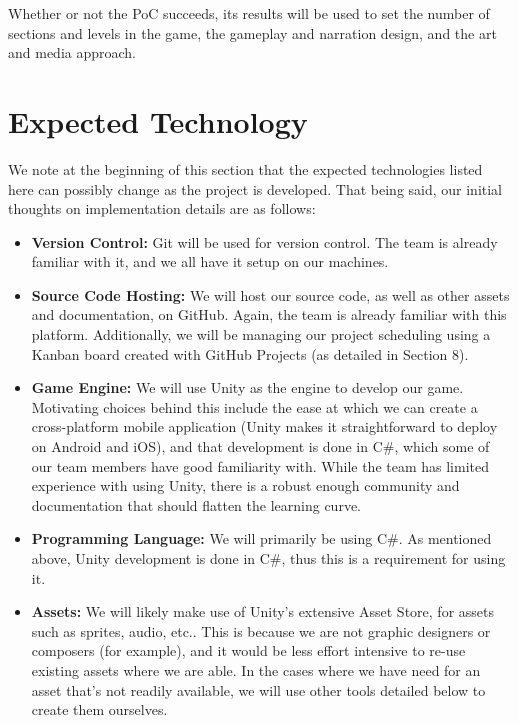 \documentclass{article}
\begin{document}
\noindent Whether or not the PoC succeeds, its results will be used to set the
number of sections and levels in the game, the gameplay and narration design,
and the art and media approach.

\section{Expected Technology}

We note at the beginning of this section that the expected technologies listed here can possibly change as the project is
developed. That being said, our initial thoughts on implementation details are as follows:

\begin{itemize}
    \item \textbf{Version Control:} Git will be used for version control. The team is already familiar with it, and we all
    have it setup on our machines.

    \item \textbf{Source Code Hosting:} We will host our source code, as well as other assets and documentation, on GitHub.
    Again, the team is already familiar with this platform. Additionally, we will be managing our project scheduling using a
    Kanban board created with GitHub Projects (as detailed in Section 8).

    \item \textbf{Game Engine:} We will use Unity as the engine to develop our game. Motivating choices behind this include
    the ease at which we can create a cross-platform mobile application (Unity makes it straightforward to deploy on Android
    and iOS), and that development is done in C\#, which some of our team members have good familiarity with. While the team
    has limited experience with using Unity, there is a robust enough community and documentation that should flatten the
    learning curve.

    \item \textbf{Programming Language:} We will primarily be using C\#. As mentioned above, Unity development is done in
    C\#, thus this is a requirement for using it.

    \item \textbf{Assets:} We will likely make use of Unity's extensive Asset Store, for assets such as sprites, audio, etc..
    This is because we are not graphic designers or composers (for example), and it would be less effort intensive to re-use existing assets
    where we are able. In the cases where we have need for an asset that's not readily available, we will use other tools detailed below to create them ourselves.


\end{itemize}
\end{document}
